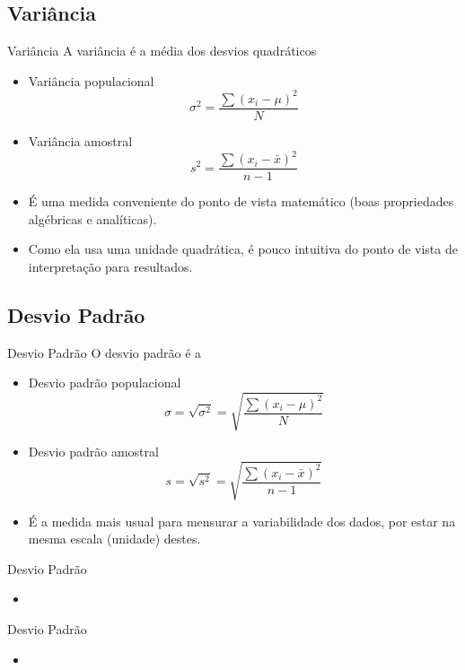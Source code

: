 \documentclass{beamer}
\begin{document}
\subsection{Variância}
\begin{frame}{Variância}
A variância é a média dos desvios quadráticos
  \begin{itemize}
  \item Variância populacional
$$\sigma^2 = \frac{\sum (x_i - \mu)^2}{N}$$
\item Variância amostral
$$s^2 = \frac{\sum (x_i - \bar{x})^2}{n-1}$$
\item É uma medida conveniente do ponto de vista matemático (boas
  propriedades algébricas e analíticas).
\item Como ela usa uma unidade quadrática, é pouco intuitiva do ponto
  de vista de interpretação para resultados.
  \end{itemize}
\end{frame}

\subsection{Desvio Padrão}
\begin{frame}{Desvio Padrão}
  O desvio padrão é a 
  \begin{itemize}
  \item Desvio padrão populacional
    $$ \sigma = \sqrt{ \sigma^2 } = \sqrt{ \frac{\sum (x_i - \mu)^2}{N} } $$
  \item Desvio padrão amostral
    $$ s = \sqrt{s^2 } = \sqrt{ \frac{\sum (x_i - \bar{x})^2}{n-1} } $$
  \item É a medida mais usual para mensurar a variabilidade dos dados,
    por estar na mesma escala (unidade) destes.
  \end{itemize}
\end{frame}

\begin{frame}{Desvio Padrão}
  \begin{itemize}
  \item 
  \end{itemize}
\end{frame}

\begin{frame}{Desvio Padrão}
  \begin{itemize}
  \item 
  \end{itemize}
\end{frame}
\end{document}
